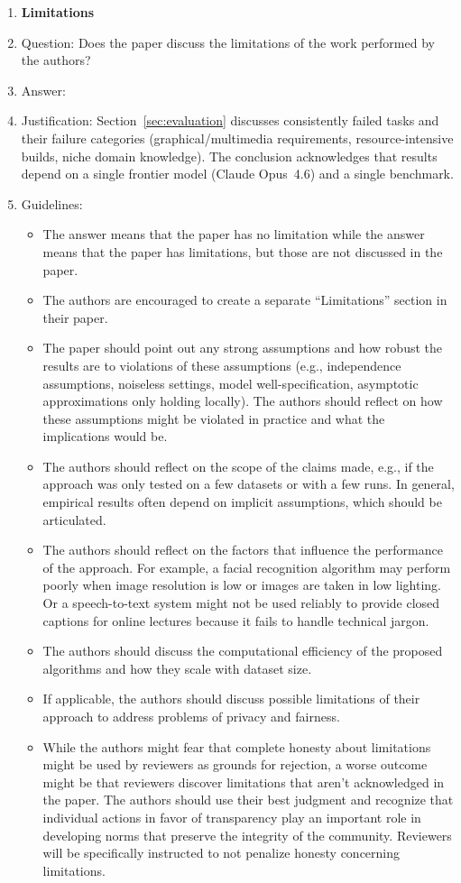 \documentclass{article}
\begin{document}
\begin{enumerate}
\item {\bf Limitations}
    \item[] Question: Does the paper discuss the limitations of the work performed by the authors?
    \item[] Answer: \answerYes{}
    \item[] Justification: Section~\ref{sec:evaluation} discusses consistently failed tasks and their failure categories (graphical/multimedia requirements, resource-intensive builds, niche domain knowledge). The conclusion acknowledges that results depend on a single frontier model (Claude Opus~4.6) and a single benchmark.
    \item[] Guidelines:
    \begin{itemize}
        \item The answer \answerNA{} means that the paper has no limitation while the answer \answerNo{} means that the paper has limitations, but those are not discussed in the paper. 
        \item The authors are encouraged to create a separate ``Limitations'' section in their paper.
        \item The paper should point out any strong assumptions and how robust the results are to violations of these assumptions (e.g., independence assumptions, noiseless settings, model well-specification, asymptotic approximations only holding locally). The authors should reflect on how these assumptions might be violated in practice and what the implications would be.
        \item The authors should reflect on the scope of the claims made, e.g., if the approach was only tested on a few datasets or with a few runs. In general, empirical results often depend on implicit assumptions, which should be articulated.
        \item The authors should reflect on the factors that influence the performance of the approach. For example, a facial recognition algorithm may perform poorly when image resolution is low or images are taken in low lighting. Or a speech-to-text system might not be used reliably to provide closed captions for online lectures because it fails to handle technical jargon.
        \item The authors should discuss the computational efficiency of the proposed algorithms and how they scale with dataset size.
        \item If applicable, the authors should discuss possible limitations of their approach to address problems of privacy and fairness.
        \item While the authors might fear that complete honesty about limitations might be used by reviewers as grounds for rejection, a worse outcome might be that reviewers discover limitations that aren't acknowledged in the paper. The authors should use their best judgment and recognize that individual actions in favor of transparency play an important role in developing norms that preserve the integrity of the community. Reviewers will be specifically instructed to not penalize honesty concerning limitations.
    \end{itemize}


\end{enumerate}
\end{document}
